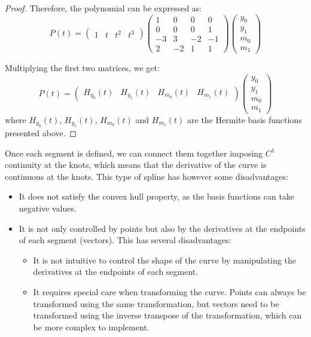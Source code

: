 \begin{proof}
    Therefore, the polynomial can be expressed as:
    \[P(t) =
    \begin{pmatrix}
        1 & t & t^2 & t^3
    \end{pmatrix}
    \begin{pmatrix}
    1 & 0 & 0 & 0 \\
    0 & 0 & 0 & 1 \\
    -3 & 3 & -2 & -1 \\
    2 & -2 & 1 & 1
    \end{pmatrix}
    \begin{pmatrix}
        y_0 \\ y_1 \\ m_0 \\ m_1
    \end{pmatrix}\]

    Multiplying the first two matrices, we get:
    \[P(t) =
    \begin{pmatrix}
    H_{y_0}(t) & H_{y_1}(t) & H_{m_0}(t) & H_{m_1}(t)
    \end{pmatrix}
    \begin{pmatrix}
        y_0 \\ y_1 \\ m_0 \\ m_1
    \end{pmatrix}\]
    where $H_{y_0}(t)$, $H_{y_1}(t)$, $H_{m_0}(t)$ and $H_{m_1}(t)$ are the Hermite basis functions presented above.
\end{proof}

Once each segment is defined, we can connect them together imposing $C^1$ continuity at the knots, which means that the derivative of the curve is continuous at the knots. This type of spline has however some disadvantages:
\begin{itemize}
    \item It does not satisfy the convex hull property, as the basis functions can take negative values.
    \item It is not only controlled by points but also by the derivatives at the endpoints of each segment (vectors). This has several disadvantages:
    \begin{itemize}
        \item It is not intuitive to control the shape of the curve by manipulating the derivatives at the endpoints of each segment.
        \item It requires special care when transforming the curve. Points can always be transformed using the same transformation, but vectors need to be transformed using the inverse transpose of the transformation, which can be more complex to implement.
    \end{itemize}
\end{itemize}

